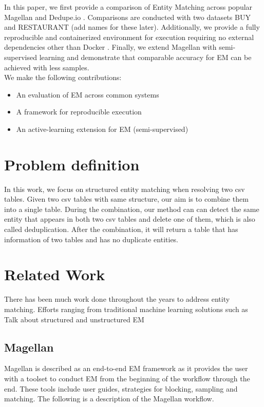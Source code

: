 \documentclass[letterpaper,twocolumn,10pt]{article}
\begin{document}

In this paper, we first provide a comparison of Entity Matching across popular Magellan and Dedupe.io \cite{bilenko2004learnable}. Comparisons are conducted with two datasets BUY and RESTAURANT (add names for these later). Additionally, we provide a fully reproducible and containerized environment for execution requiring no external dependencies other than Docker \cite{docker:2014}. Finally, we extend Magellan with semi-supervised learning and demonstrate that comparable accuracy for EM can be achieved with less samples. 
\\

We make the following contributions:
\begin{itemize}
  \item An evaluation of EM across common systems
  \item A framework for reproducible execution
  \item An active-learning extension for EM (semi-supervised)
\end{itemize}

\section{Problem definition}
In this work, we focus on structured entity matching when resolving two csv tables. Given two csv tables with same structure, our aim is to combine them into a single table. During the combination, our method can can detect the same entity that appears in both two csv tables and delete one of them, which is also called deduplication. After the combination, it will return a table that has information of two tables and has no duplicate entities.

\section{Related Work}


There has been much work done throughout the years to address entity matching. Efforts ranging from traditional machine learning solutions such as 
Talk about structured and unstructured EM



\subsection{Magellan}
Magellan is described as an end-to-end EM framework as it provides the user with a toolset to conduct EM from the beginning of the workflow through the end. These tools include user guides, strategies for blocking, sampling and matching. The following is a description of the Magellan workflow.
\end{document}
